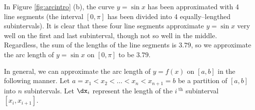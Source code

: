 In Figure \ref{fig:arcintro} (b), the curve $y=\sin x$ has been approximated with 4 line segments (the interval $[0,\pi]$ has been divided into 4 equally--lengthed subintervals). It is clear that these four line segments approximate $y=\sin x$ very well on the first and last subinterval, though not so well in the middle. Regardless, the sum of the lengths of the line segments is $3.79$, so we approximate the arc length of $y=\sin x$ on $[0,\pi]$ to be $3.79$. 


%
%
%
%
%



In general,  we can approximate the arc length of $y=f(x)$ on $[a,b]$ in the following manner. Let $a=x_1 < x_2 < \ldots < x_n< x_{n+1}=b$ be a partition of $[a,b]$ into $n$ subintervals. Let $\dx_i$ represent the length of the $i\,^\text{th}$ subinterval $[x_i,x_{i+1}]$.

